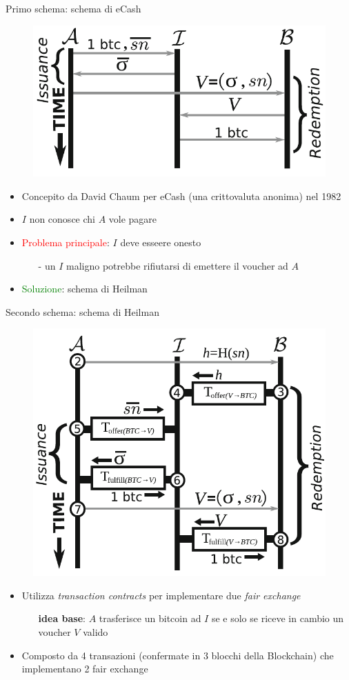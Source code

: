 \documentclass{beamer}
\newcommand\red[1]{\textcolor{red}{#1}}
\begin{document}
  \begin{frame}{Primo schema: schema di eCash}
      \begin{figure}
          \centering
          \includegraphics[width=0.6\linewidth]{../img/eCash-scheme.png}
      \end{figure}
      \begin{itemize}
          \item Concepito da David Chaum per eCash (una crittovaluta anonima) nel 1982 \cite{chaum1982blind}
          \item $I$ non conosce chi $A$ vole pagare \pause
          \item \red{Problema principale}: $I$ deve esseere onesto
          \begin{itemize}
              \item[-] un $I$ maligno potrebbe rifiutarsi di emettere il voucher ad $A$
          \end{itemize}
          \pause
          \item \textcolor{green}{Soluzione}: schema di Heilman \cite{heilman-blindly-signed-contracts}
      \end{itemize}
  \end{frame}
  
  
  
  
  \begin{frame}{Secondo schema: schema di Heilman}
      \begin{figure}
          \centering
          \includegraphics[width=0.4\linewidth]{../img/heilman-scheme.png}
      \end{figure}
      \begin{itemize}
          \item Utilizza \emph{transaction contracts} per implementare due \emph{fair exchange}
          \begin{itemize}
              \item[\MVRightarrow] \textbf{idea base}: $A$ trasferisce un bitcoin ad $I$ se e solo se riceve in cambio un voucher $V$ valido
          \end{itemize}
          \item Composto da 4 transazioni (confermate in 3 blocchi della Blockchain) che implementano 2 fair exchange
      \end{itemize}
  \end{frame}
  
\end{document}
